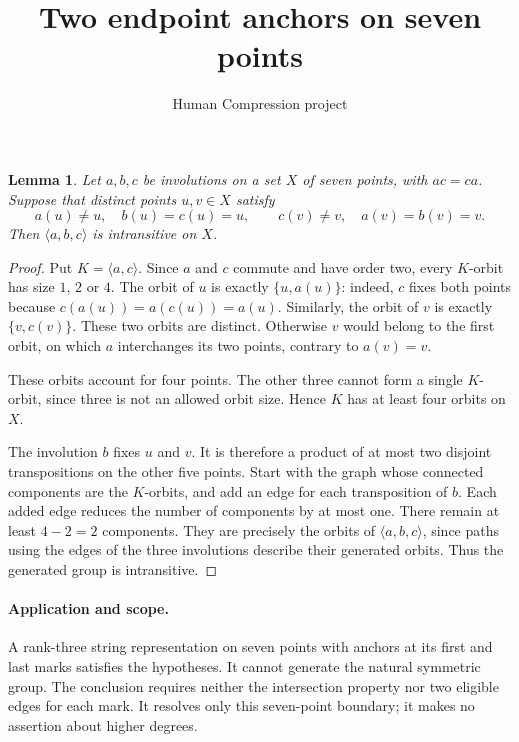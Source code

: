 \documentclass[11pt,a4paper]{article}
\title{Two endpoint anchors on seven points}\author{Human Compression project}\date{}
\newtheorem{lemma}{Lemma}
\begin{document}
\maketitle
\begin{lemma}
Let $a,b,c$ be involutions on a set $X$ of seven points, with $ac=ca$.
Suppose that distinct points $u,v\in X$ satisfy
\[
 a(u)\ne u,\quad b(u)=c(u)=u,
 \qquad c(v)\ne v,\quad a(v)=b(v)=v.
\]
Then $\langle a,b,c\rangle$ is intransitive on $X$.
\end{lemma}
\begin{proof}
Put $K=\langle a,c\rangle$. Since $a$ and $c$ commute and have order
two, every $K$-orbit has size $1$, $2$ or $4$. The orbit of $u$ is
exactly $\{u,a(u)\}$: indeed, $c$ fixes both points because
$c(a(u))=a(c(u))=a(u)$. Similarly, the orbit of $v$ is exactly
$\{v,c(v)\}$. These two orbits are distinct. Otherwise $v$ would
belong to the first orbit, on which $a$ interchanges its two points,
contrary to $a(v)=v$.

These orbits account for four points. The other three cannot form a
single $K$-orbit, since three is not an allowed orbit size. Hence $K$
has at least four orbits on $X$.

The involution $b$ fixes $u$ and $v$. It is therefore a product of at
most two disjoint transpositions on the other five points. Start with
the graph whose connected components are the $K$-orbits, and add an
edge for each transposition of $b$. Each added edge reduces the number
of components by at most one. There remain at least $4-2=2$ components.
They are precisely the orbits of $\langle a,b,c\rangle$, since paths
using the edges of the three involutions describe their generated orbits.
Thus the generated group is intransitive.
\end{proof}

\paragraph{Application and scope.}
A rank-three string representation on seven points with anchors at its
first and last marks satisfies the hypotheses. It cannot generate the
natural symmetric group. The conclusion requires neither the intersection
property nor two eligible edges for each mark. It resolves only this
seven-point boundary; it makes no assertion about higher degrees.
\end{document}
